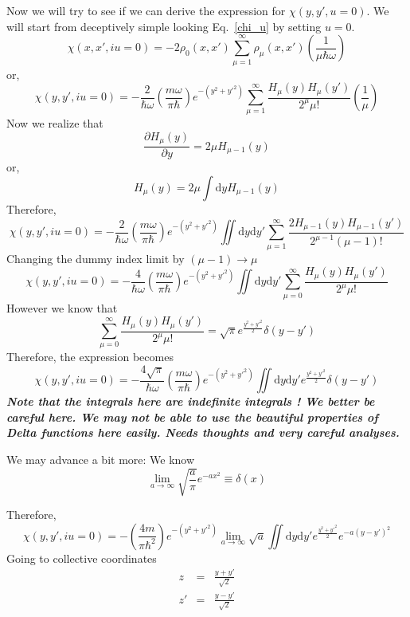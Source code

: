 \documentclass{article}
\newcommand{\eq}{\begin{equation}}
\newcommand{\qe}{\end{equation}}
\newcommand{\diff}{\mathrm{d}}
\newcommand{\fact}[1]{#1!}
\begin{document}
Now we will try to see if we can derive the expression for $\chi(y, y', u=0)$. We will start from deceptively simple looking Eq.~\eqref{chi_u} by setting $u = 0$.
\eq\label{chi_u0}
 \chi(x, x', i u=0)= -2\rho_{0}(x, x') \sum_{\mu=1}^{\infty}\rho_{\mu}(x, x')\left( \frac{1}{\mu \hbar \omega} \right)
\qe
or, 
\eq\label{chi_u0_full}
 \chi(y, y', i u=0)= -\frac{2}{\hbar \omega}\left( \frac{m \omega}{\pi \hbar}\right) e^{-(y^2+{y'}^2)} \sum_{\mu=1}^{\infty}\frac{H_{\mu}(y)H_{\mu}(y')}{2^{\mu}\fact{\mu}}\left( \frac{1}{\mu} \right)
\qe
Now we realize that 
\eq
\frac{\partial H_{\mu}(y)}{\partial y} = 2 \mu H_{\mu-1}(y)
\qe
or,
\eq
H_{\mu}(y) = 2\mu \int \diff y H_{\mu - 1}(y)
\qe
Therefore, 
\eq\label{chi_u0_wint}
 \chi(y, y', i u=0)= -\frac{2}{\hbar \omega}\left( \frac{m \omega}{\pi \hbar}\right) e^{-(y^2+{y'}^2)} \iint \diff y \diff y' \sum_{\mu=1}^{\infty}\frac{2 H_{\mu-1}(y)H_{\mu-1}(y')}{2^{\mu-1}\fact{(\mu-1)}}
\qe
Changing the dummy index limit by $(\mu -1) \rightarrow \mu$
\eq\label{chi_u0_wint2}
 \chi(y, y', i u=0)= -\frac{4}{\hbar \omega}\left( \frac{m \omega}{\pi \hbar}\right) e^{-(y^2+{y'}^2)} \iint \diff y \diff y' \sum_{\mu=0}^{\infty}\frac{H_{\mu}(y)H_{\mu}(y')}{2^{\mu}\fact{\mu}}
\qe
However we know that 
\eq
\sum_{\mu=0}^{\infty}\frac{H_{\mu}(y)H_{\mu}(y')}{2^{\mu}\fact{\mu}} =\sqrt{\pi}  e^{\frac{y^2+{y'}^2}{2}}\delta(y-y')
\qe
Therefore, the expression becomes 
\eq\label{chi_u0_wint3}
 \chi(y, y', i u=0)= -\frac{4\sqrt{\pi}}{\hbar \omega}\left( \frac{m \omega}{\pi \hbar}\right) e^{-(y^2+{y'}^2)} \iint \diff y \diff y' e^{\frac{y^2+{y'}^2}{2}}\delta(y-y')
\qe
\textbf{\emph{Note that the integrals here are indefinite integrals ! We better be careful here. We may not be able to use the beautiful properties of Delta functions here easily. Needs thoughts and very careful analyses. }}

We may advance a bit more: We know
\eq
\lim_{a \to \infty}\sqrt{\frac{a}{\pi}}e^{-a x^2} \equiv \delta(x)
\qe

Therefore, 
\eq
\chi(y, y', i u=0)= -\left( \frac{4m}{\pi \hbar^2}\right) e^{-(y^2+{y'}^2)} \lim_{a \to \infty} \sqrt{a} \iint \diff y \diff y' e^{\frac{y^2+{y'}^2}{2}}e^{-a(y-y')^2}
\qe
Going to collective coordinates
\begin{eqnarray}\label{collcoord_y}
z &=& \frac{y+y'}{\sqrt{2}}\\
z' &=&  \frac{y-y'}{\sqrt{2}}
\end{eqnarray}

\end{document}
